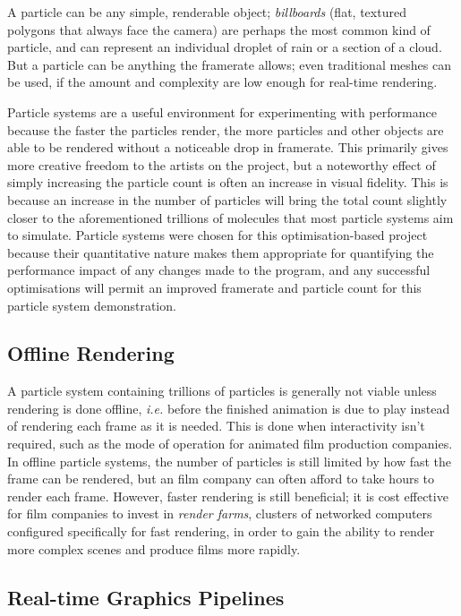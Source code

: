 \documentclass[11pt, a4paper, twocolumn]{article}
\begin{document}
A particle can be any simple, renderable object; \emph{billboards} (flat, textured polygons that always face the camera) are perhaps the most common kind of particle, and can represent an individual droplet of rain or a section of a cloud. But a particle can be anything the framerate allows; even traditional meshes can be used, if the amount and complexity are low enough for real-time rendering.

Particle systems are a useful environment for experimenting with performance because the faster the particles render, the more particles and other objects are able to be rendered without a noticeable drop in framerate. This primarily gives more creative freedom to the artists on the project, but a noteworthy effect of simply increasing the particle count is often an increase in visual fidelity. This is because an increase in the number of particles will bring the total count slightly closer to the aforementioned trillions of molecules that most particle systems aim to simulate. Particle systems were chosen for this optimisation-based project because their quantitative nature makes them appropriate for quantifying the performance impact of any changes made to the program, and any successful optimisations will permit an improved framerate and particle count for this particle system demonstration.

\subsection{Offline Rendering}

A particle system containing trillions of particles is generally not viable unless rendering is done offline, \emph{i.e.} before the finished animation is due to play instead of rendering each frame as it is needed. This is done when interactivity isn't required, such as the mode of operation for animated film production companies. In offline particle systems, the number of particles is still limited by how fast the frame can be rendered, but an film company can often afford to take hours to render each frame. However, faster rendering is still beneficial; it is cost effective for film companies to invest in \emph{render farms}, clusters of networked computers configured specifically for fast rendering, in order to gain the ability to render more complex scenes and produce films more rapidly.

\subsection{Real-time Graphics Pipelines}
\end{document}
